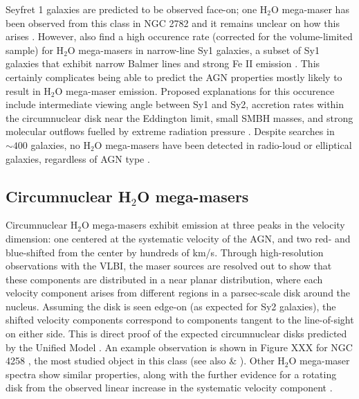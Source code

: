 Seyfret 1 galaxies are predicted to be observed face-on; one H$_2$O mega-maser has been observed from this class in NGC 2782 and it remains unclear on how this arises \citep{Tarchi_2011}. However, \citet{Tarchi_2011} also find a high occurence rate (corrected for the volume-limited sample) for H$_2$O mega-masers in narrow-line Sy1 galaxies, a subset of Sy1 galaxies that exhibit narrow Balmer lines and strong Fe II emission \citep{tarchi2012}. This certainly complicates being able to predict the AGN properties mostly likely to result in H$_2$O mega-maser emission. Proposed explanations for this occurence include intermediate viewing angle between Sy1 and Sy2, accretion rates within the circumnuclear disk near the Eddington limit, small SMBH masses, and strong molecular outflows fuelled by extreme radiation pressure \citep{tarchi2012}. Despite searches in $\sim 400$ galaxies, no H$_2$O mega-masers have been detected in radio-loud or elliptical galaxies, regardless of AGN type \citep{tarchi2012}. 


\subsection{Circumnuclear H$_2$O mega-masers}
\label{sub:h20_agn}

Circumnuclear H$_2$O mega-masers exhibit emission at three peaks in the velocity dimension: one centered at the systematic velocity of the AGN, and two red- and blue-shifted from the center by hundreds of km/s. Through high-resolution observations with the VLBI, the maser sources are resolved out to show that these components are distributed in a near planar distribution, where each velocity component arises from different regions in a parsec-scale disk around the nucleus. Assuming the disk is seen edge-on (as expected for Sy2 galaxies), the shifted velocity components correspond to components tangent to the line-of-sight on either side. This is direct proof of the expected circumnuclear disks predicted by the Unified Model \citep{lo2005}. An example observation is shown in Figure XXX for NGC 4258 \citep{Bragg_2000}, the most studied object in this class (see also \citet{Miyoshi_1994} \& \citet{Herrnstein_1999}). Other H$_2$O mega-maser spectra show similar properties, along with the further evidence for a rotating disk from the observed linear increase in the systematic velocity component \citep{lo2005}.  

